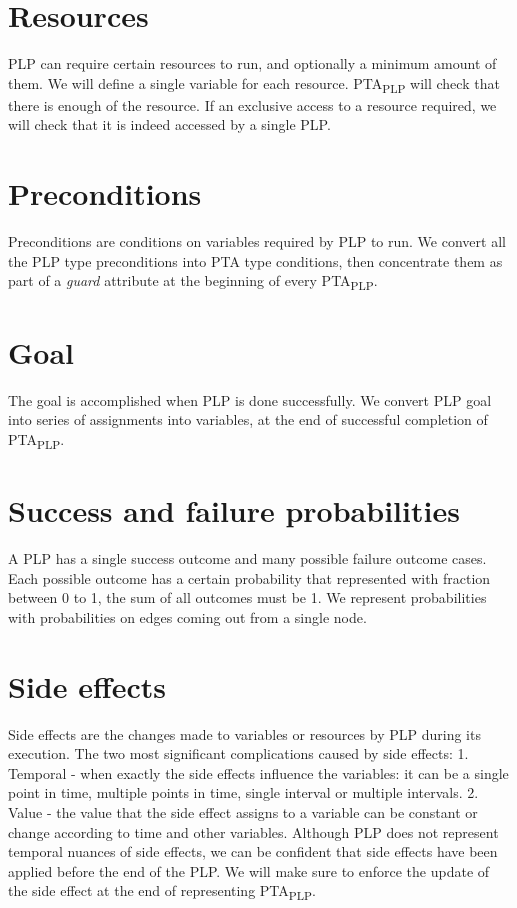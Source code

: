 \section{Resources \label{plp_to_pta_resources}}
PLP can require certain resources to run, and optionally a minimum amount of them. We will define a single variable for each resource. PTA\textsubscript{PLP} will check that there is enough of the resource. If an exclusive access to a resource required, we will check that it is indeed accessed by a single PLP.\\
\section{Preconditions \label{plp_to_pta_preconditions}}
Preconditions are conditions on variables required by PLP to run. We convert all the PLP type preconditions into PTA type conditions, then concentrate them as part of a \textit{guard} attribute at the beginning of every PTA\textsubscript{PLP}.\\
\section{Goal \label{plp_to_pta_goal}}
The goal is accomplished when PLP is done successfully. We convert PLP goal into series of assignments into variables, at the end of successful completion of PTA\textsubscript{PLP}.\\
\section{Success and failure probabilities \label{plp_to_pta_success_and_failure_probabilities}}
A PLP has a single success outcome and many possible failure outcome cases. Each possible outcome has a certain probability that represented with fraction between 0 to 1, the sum of all outcomes must be 1. We represent probabilities with probabilities on edges coming out from a single node. \\
\section{Side effects \label{plp_to_pta_side_effects}}
Side effects are the changes made to variables or resources by PLP during its execution. The two most significant complications caused by side effects: 1. Temporal - when exactly the side effects influence the variables: it can be a single point in time, multiple points in time, single interval or multiple intervals. 2. Value - the value that the side effect assigns to a variable can be constant or change according to time and other variables. Although PLP does not represent temporal nuances of side effects, we can be confident that side effects have been applied before the end of the PLP. We will make sure to enforce the update of the side effect at the end of representing PTA\textsubscript{PLP}. \\
